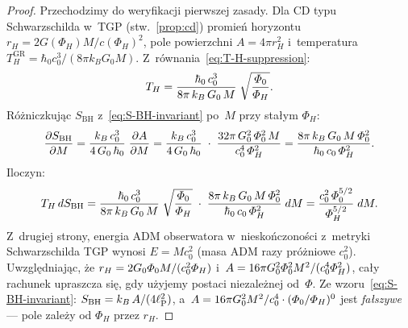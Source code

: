 \begin{proof}
Przechodzimy do weryfikacji pierwszej zasady. Dla CD typu
Schwarzschilda w~TGP (stw.~\ref{prop:cd})
promie\'n horyzontu $r_H = 2G(\Phi_H)M/c(\Phi_H)^2$,
pole powierzchni $A = 4\pi r_H^2$ i~temperatura
$T_H^{\mathrm{GR}} = \hbar_0 c_0^3/(8\pi k_B G_0 M)$.
Z~r\'ownania~\eqref{eq:T-H-suppression}:
\begin{equation}
    T_H = \frac{\hbar_0\,c_0^3}{8\pi\,k_B\,G_0\,M}
          \;\sqrt{\frac{\varPhi_0}{\varPhi_H}}.
\end{equation}
R\'o\.zniczkuj\k{a}c $S_{\mathrm{BH}}$
z~\eqref{eq:S-BH-invariant} po~$M$ przy sta\l{}ym $\Phi_H$:
\begin{equation}
    \frac{\partial S_{\mathrm{BH}}}{\partial M}
    = \frac{k_B\,c_0^3}{4\,G_0\,\hbar_0}\;\frac{\partial A}{\partial M}
    = \frac{k_B\,c_0^3}{4\,G_0\,\hbar_0}\;\cdot\;
      \frac{32\pi\,G_0^2\,\varPhi_0^2\,M}{c_0^4\,\varPhi_H^2}
    = \frac{8\pi\,k_B\,G_0\,M\,\varPhi_0^2}
           {\hbar_0\,c_0\,\varPhi_H^2}.
\end{equation}
Iloczyn:
\begin{equation}
    T_H\,dS_{\mathrm{BH}}
    = \frac{\hbar_0\,c_0^3}{8\pi\,k_B\,G_0\,M}
      \;\sqrt{\frac{\varPhi_0}{\varPhi_H}}
      \;\cdot\;
      \frac{8\pi\,k_B\,G_0\,M\,\varPhi_0^2}
           {\hbar_0\,c_0\,\varPhi_H^2}\;dM
    = \frac{c_0^2\,\varPhi_0^{5/2}}{\varPhi_H^{5/2}}\;dM.
\end{equation}
Z~drugiej strony, energia ADM obserwatora w~niesko\'nczono\'sci
z~metryki Schwarzschilda TGP wynosi $E = Mc_0^2$
(masa ADM razy pr\'o\.zniowe $c_0^2$).
Uwzgl\k{e}dniaj\k{a}c, \.ze $r_H = 2G_0\varPhi_0 M/(c_0^2\varPhi_H)$
i~$A = 16\pi G_0^2\varPhi_0^2 M^2/(c_0^4\varPhi_H^2)$, ca\l{}y
rachunek upraszcza si\k{e}, gdy u\.zyjemy postaci niezale\.znej
od~$\Phi$. Ze wzoru~\eqref{eq:S-BH-invariant}:
$S_{\mathrm{BH}} = k_B\,A/(4\ell_{\mathrm{P}}^2)$,
a~$A = 16\pi G_0^2 M^2/c_0^4 \cdot (\varPhi_0/\varPhi_H)^0$
jest \emph{fa\l{}szywe} --- pole zale\.zy od $\Phi_H$ przez $r_H$.


\end{proof}
